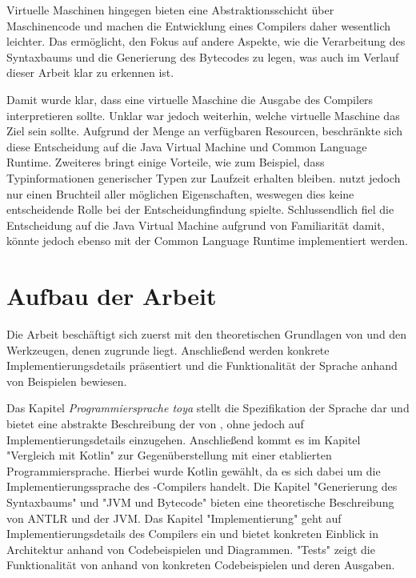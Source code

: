 Virtuelle Maschinen hingegen bieten eine Abstraktionsschicht über Maschinencode und machen die Entwicklung eines Compilers daher wesentlich leichter. Das ermöglicht, den Fokus auf andere Aspekte, wie die Verarbeitung des Syntaxbaums und die Generierung des Bytecodes zu legen, was auch im Verlauf dieser Arbeit klar zu erkennen ist.

Damit wurde klar, dass eine virtuelle Maschine die Ausgabe des Compilers interpretieren sollte. Unklar war jedoch weiterhin, welche virtuelle Maschine das Ziel sein sollte. Aufgrund der Menge an verfügbaren Resourcen, beschränkte sich diese Entscheidung auf die Java Virtual Machine und Common Language Runtime. Zweiteres bringt einige Vorteile, wie zum Beispiel, dass Typinformationen generischer Typen zur Laufzeit erhalten bleiben. \Toya nutzt jedoch nur einen Bruchteil aller möglichen Eigenschaften, weswegen dies keine entscheidende Rolle bei der Entscheidungfindung spielte. Schlussendlich fiel die Entscheidung auf die Java Virtual Machine aufgrund von Familiarität damit, könnte jedoch ebenso mit der Common Language Runtime implementiert werden.

\section{Aufbau der Arbeit}

Die Arbeit beschäftigt sich zuerst mit den theoretischen Grundlagen von \toya und den Werkzeugen, denen \toya zugrunde liegt. Anschließend werden konkrete Implementierungsdetails präsentiert und die Funktionalität der Sprache anhand von Beispielen bewiesen.

Das Kapitel \textit{Programmiersprache toya} stellt die Spezifikation der Sprache dar und bietet eine abstrakte Beschreibung der von \toya, ohne jedoch auf Implementierungsdetails einzugehen. Anschließend kommt es im Kapitel "Vergleich mit Kotlin" zur Gegenüberstellung mit einer etablierten Programmiersprache. Hierbei wurde Kotlin gewählt, da es sich dabei um die Implementierungssprache des \toya-Compilers handelt. Die Kapitel "Generierung des Syntaxbaums" und "JVM und Bytecode" bieten eine theoretische Beschreibung von ANTLR und der JVM. Das Kapitel "Implementierung" geht auf Implementierungsdetails des Compilers ein und bietet konkreten Einblick in Architektur anhand von Codebeispielen und Diagrammen. "Tests" zeigt die Funktionalität von \toya anhand von konkreten Codebeispielen und deren Ausgaben.